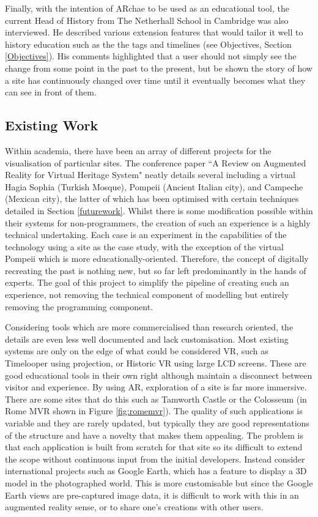 \documentclass{article}
\begin{document}
Finally, with the intention of ARchae to be used as an educational tool, the current Head of History from The Netherhall School in Cambridge was also interviewed. He described various extension features that would tailor it well to history education such as the the tags and timelines (see Objectives, Section \ref{Objectives}). His comments highlighted that a user should not simply see the change from some point in the past to the present, but be shown the story of how a site has continuously changed over time until it eventually becomes what they can see in front of them.

\subsection{Existing Work}
\label{existingwork}
Within academia, there have been an array of different projects for the visualisation of particular sites. The conference paper ``A Review on Augmented Reality for Virtual Heritage System" \cite{existing:virtualhertitagereview} neatly details several including a virtual Hagia Sophia \cite{existing:hagia} (Turkish Mosque), Pompeii \cite{existing:pompeii} (Ancient Italian city), and Campeche 
\cite{existing:campeche} (Mexican city), the latter of which has been optimised with certain techniques detailed in Section \ref{futurework}. Whilst there is some modification possible within their systems for non-programmers, the creation of such an experience is a highly technical undertaking. Each case is an experiment in the capabilities of the technology using a site as the case study, with the exception of the virtual Pompeii which is more educationally-oriented. Therefore, the concept of digitally recreating the past is nothing new, but so far left predominantly in the hands of experts. The goal of this project to simplify the pipeline of creating such an experience, not removing the technical component of modelling but entirely removing the programming component.

Considering tools which are more commercialised than research oriented, the details are even less well documented and lack customisation. Most existing systems are only on the edge of what could be considered VR, such as Timelooper using projection, or Historic VR using large LCD screens. These are good educational tools in their own right although maintain a disconnect between visitor and experience. By using AR, exploration of a site is far more immersive. There are some sites that do this such as Tamworth Castle or the Colosseum (in Rome MVR shown in Figure \ref{fig:romemvr}). The quality of such applications is variable and they are rarely updated, but typically they are good representations of the structure and have a novelty that makes them appealing. The problem is that each application is built from scratch for that site so its difficult to extend the scope without continuous input from the initial developers. Instead consider international projects such as Google Earth, which has a feature to display a 3D model in the photographed world. This is more customisable but since the Google Earth views are pre-captured image data, it is difficult to work with this in an augmented reality sense, or to share one's creations with other users.
\end{document}
